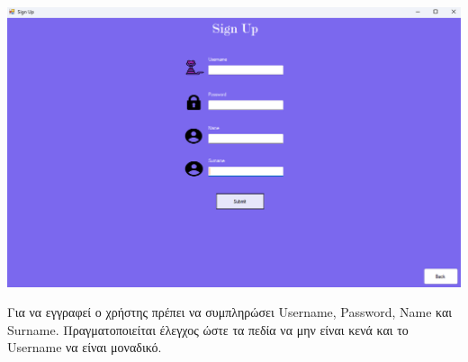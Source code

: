 \documentclass[12pt]{article}
\newcommand{\en}[1]{\foreignlanguage{English}{#1}}
\begin{document}
\begin{center}

\includegraphics[width=1\linewidth]{signup.png}

\end{center}

Για να εγγραφεί ο χρήστης πρέπει να συμπληρώσει \en{Username, Password, Name} και \en{Surname}.
Πραγματοποιείται έλεγχος ώστε τα πεδία να μην είναι κενά και το \en{Username} να είναι μοναδικό.
\end{document}
